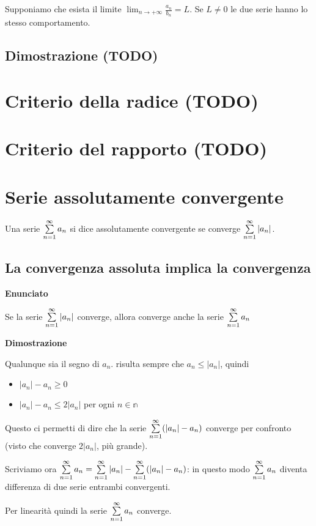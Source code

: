 Supponiamo che esista il limite $\lim_{n\to +\infty}\frac{a_n}{b_n}=L$. Se $L \neq 0$ le due serie hanno lo stesso comportamento.

\subsection{Dimostrazione (TODO)}

\section{Criterio della radice (TODO)}

\section{Criterio del rapporto (TODO)}

\section{Serie assolutamente convergente}
Una serie $\sum\limits_{n=1}^{\infty}a_n$ si dice assolutamente convergente se converge $\sum\limits_{n=1}^{\infty}|a_n|$.

\subsection{La convergenza assoluta implica la convergenza}

\textbf{Enunciato}

Se la serie $\sum\limits_{n=1}^{\infty}|a_n|$ converge, allora converge anche la serie $\sum\limits_{n=1}^{\infty}a_n$  

\textbf{Dimostrazione}

Qualunque sia il segno di $a_n$. risulta sempre che $a_n \leq |a_n|$, quindi 
\begin{itemize}
\item $|a_n|-a_n \geq 0$
\item $|a_n|-a_n \leq 2|a_n|$ per ogni $n \in \mathbb{n}$
\end{itemize}

Questo ci permetti di dire che la serie $\sum\limits_{n=1}^{\infty}(|a_n|-a_n)$ converge per confronto (visto che converge $2|a_n|$, più grande).

Scriviamo ora $\sum\limits_{n=1}^{\infty}a_n=\sum\limits_{n=1}^{\infty}|a_n|-\sum\limits_{n=1}^{\infty}(|a_n|-a_n)$: in questo modo $\sum\limits_{n=1}^{\infty}a_n$ diventa differenza di due serie entrambi convergenti.

Per linearità quindi la serie $\sum\limits_{n=1}^{\infty}a_n$ converge.


